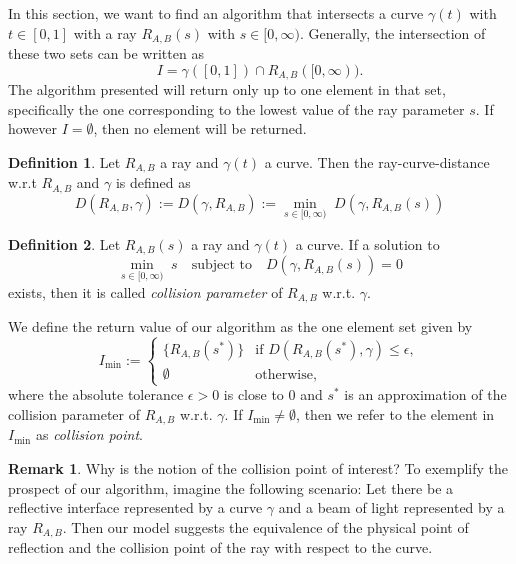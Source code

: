 \documentclass[a4paper, 11pt]{report}
\theoremstyle{definition}
\newtheorem{definition}{Definition}[section]
\newtheorem*{remark}{Remark}
\renewcommand{\emph}[1]{\textit{#1}}
\begin{document}
	In this section, we want to find an algorithm that intersects a curve $\gamma(t)$ with $t \in [0, 1]$ with a ray $R_{A,B}(s)$ with $s \in [0, \infty)$. Generally, the intersection of these two sets can be written as
		$$I = \gamma([0,1]) \cap R_{A,B}([0,\infty)).$$
	The algorithm presented will return only up to one element in that set, specifically the one corresponding to the lowest value of the ray parameter $s$. If however $I = \emptyset$, then no element will be returned.

	\begin{definition}
		Let $R_{A,B}$ a ray and $\gamma(t)$ a curve. Then the ray-curve-distance w.r.t $R_{A,B}$ and $\gamma$ is defined as
			$$ D(R_{A,B}, \gamma) := D(\gamma, R_{A,B}) := \underset{s\in[0,\infty)}{\min} \; D(\gamma, R_{A,B}(s))$$
	\end{definition}
	
	\begin{definition}\label{def:raycollisionparameter}
		Let $R_{A,B}(s)$ a ray and $\gamma(t)$ a curve. If a solution to 
			$$\underset{s\in[0,\infty)}{\min} \; s \quad \text{subject to} \quad D(\gamma, R_{A,B}(s)) = 0$$
		exists, then it is called \emph{collision parameter} of $R_{A,B}$ w.r.t. $\gamma$.
	\end{definition}

	We define the return value of our algorithm as the one element set given by
		$$ I_{\min} := 
			\begin{cases}
				\{R_{A,B}(s^*)\} 	&\text{if } D(R_{A,B}(s^*), \gamma) \leq \epsilon, \\
				\emptyset			&\text{otherwise,}	
			\end{cases}
		$$
	where the absolute tolerance $\epsilon > 0$ is close to $0$ and $s^*$ is an approximation of the collision parameter of $R_{A,B}$ w.r.t. $\gamma$. If $I_{\min} \neq \emptyset$, then we refer to the element in $I_{\min}$ as \emph{collision point}.

	\begin{remark}
		Why is the notion of the collision point of interest? To exemplify the prospect of our algorithm, imagine the following scenario: Let there be a reflective interface represented by a curve $\gamma$ and a beam of light represented by a ray $R_{A,B}$. Then our model suggests the equivalence of the physical point of reflection and the collision point of the ray with respect to the curve.
	\end{remark}
\end{document}
